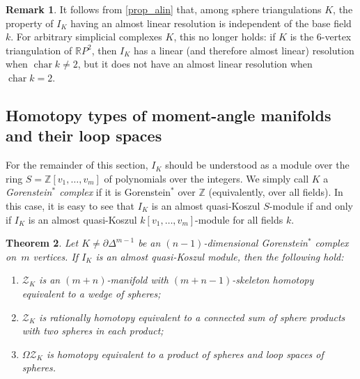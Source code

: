 \documentclass[a4paper,10pt]{amsart}
\newtheorem{theorem}{Theorem}[section]
\theoremstyle{definition}
\newtheorem{remark}[theorem]{Remark}
\theoremstyle{remark}
\begin{document}
\begin{remark}
It follows from \cref{prop_alin} that, among sphere triangulations $K$, the property of $I_K$ having an almost linear resolution is independent of the base field $k$. For arbitrary simplicial complexes $K$, this no longer holds: if $K$ is the $6$-vertex triangulation of $\mathbb{R}P^2$, then $I_K$ has a linear (and therefore almost linear) resolution when $\operatorname{char}k\neq 2$, but it does not have an almost linear resolution when $\operatorname{char}k=2$.
\end{remark}


\subsection*{Homotopy types of moment-angle manifolds and their loop spaces}

For the remainder of this section, $I_K$ should be understood as a module over the ring $S=\mathbb{Z}[v_1,\ldots,v_m]$ of polynomials over the integers. We simply call $K$ a \emph{Gorenstein$^*$ complex} if it is Gorenstein$^*$ over $\mathbb{Z}$ (equivalently, over all fields). In this case, it is easy to see that $I_K$ is an almost quasi-Koszul $S$-module if and only if $I_K$ is an almost quasi-Koszul $k[v_1,\ldots,v_m]$-module for all fields $k$.

\begin{theorem} \label{thm_conn_sum}
Let $K\neq\partial\Delta^{m-1}$ be an $(n-1)$-dimensional Gorenstein$^*$ complex on~$m$ vertices. If $I_K$ is an almost quasi-Koszul module, then the following hold:
\begin{enumerate}[label={\normalfont(\arabic*)}]
\item $\mathcal{Z}_K$ is an $(m+n)$-manifold with $(m+n-1)$-skeleton homotopy equivalent to a wedge of spheres; \label{item1}
\item $\mathcal{Z}_K$ is rationally homotopy equivalent to a connected sum of sphere products with two spheres in each product; \label{item2}
\item $\Omega\mathcal{Z}_K$ is homotopy equivalent to a product of spheres and loop spaces of spheres.
\end{enumerate}
\end{theorem}
\end{document}

